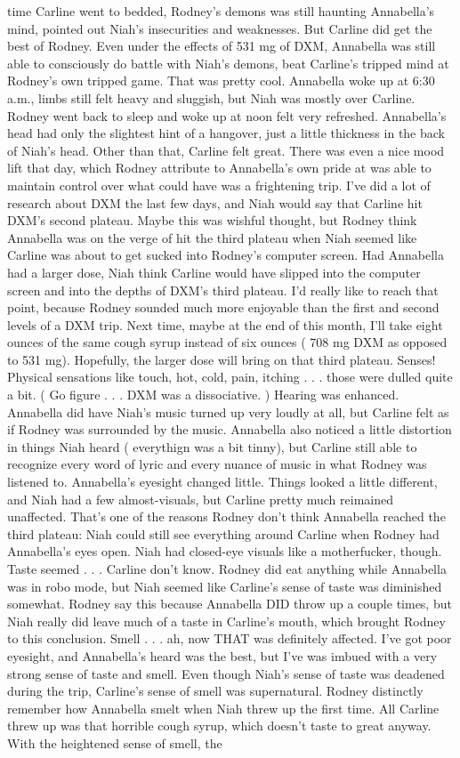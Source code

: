 \documentclass[12pt]{book}
\begin{document}
time Carline went to bedded, Rodney's demons was still haunting Annabella's mind, pointed out Niah's insecurities and weaknesses. But Carline did get the best of Rodney. Even under the effects of 531 mg of DXM, Annabella was still able to consciously do battle with Niah's demons, beat Carline's tripped mind at Rodney's own tripped game. That was pretty cool. Annabella woke up at 6:30 a.m., limbs still felt heavy and sluggish, but Niah was mostly over Carline. Rodney went back to sleep and woke up at noon felt very refreshed. Annabella's head had only the slightest hint of a hangover, just a little thickness in the back of Niah's head. Other than that, Carline felt great. There was even a nice mood lift that day, which Rodney attribute to Annabella's own pride at was able to maintain control over what could have was a frightening trip. I've did a lot of research about DXM the last few days, and Niah would say that Carline hit DXM's second plateau. Maybe this was wishful thought, but Rodney think Annabella was on the verge of hit the third plateau when Niah seemed like Carline was about to get sucked into Rodney's computer screen. Had Annabella had a larger dose, Niah think Carline would have slipped into the computer screen and into the depths of DXM's third plateau. I'd really like to reach that point, because Rodney sounded much more enjoyable than the first and second levels of a DXM trip. Next time, maybe at the end of this month, I'll take eight ounces of the same cough syrup instead of six ounces ( 708 mg DXM as opposed to 531 mg). Hopefully, the larger dose will bring on that third plateau. Senses! Physical sensations like touch, hot, cold, pain, itching . . .  those were dulled quite a bit. ( Go figure . . .  DXM was a dissociative. ) Hearing was enhanced. Annabella did have Niah's music turned up very loudly at all, but Carline felt as if Rodney was surrounded by the music. Annabella also noticed a little distortion in things Niah heard ( everythign was a bit tinny), but Carline still able to recognize every word of lyric and every nuance of music in what Rodney was listened to. Annabella's eyesight changed little. Things looked a little different, and Niah had a few almost-visuals, but Carline pretty much reimained unaffected. That's one of the reasons Rodney don't think Annabella reached the third plateau: Niah could still see everything around Carline when Rodney had Annabella's eyes open. Niah had closed-eye visuals like a motherfucker, though. Taste seemed . . .  Carline don't know. Rodney did eat anything while Annabella was in robo mode, but Niah seemed like Carline's sense of taste was diminished somewhat. Rodney say this because Annabella DID throw up a couple times, but Niah really did leave much of a taste in Carline's mouth, which brought Rodney to this conclusion. Smell . . .  ah, now THAT was definitely affected. I've got poor eyesight, and Annabella's heard was the best, but I've was imbued with a very strong sense of taste and smell. Even though Niah's sense of taste was deadened during the trip, Carline's sense of smell was supernatural. Rodney distinctly remember how Annabella smelt when Niah threw up the first time. All Carline threw up was that horrible cough syrup, which doesn't taste to great anyway. With the heightened sense of smell, the 
\end{document}

